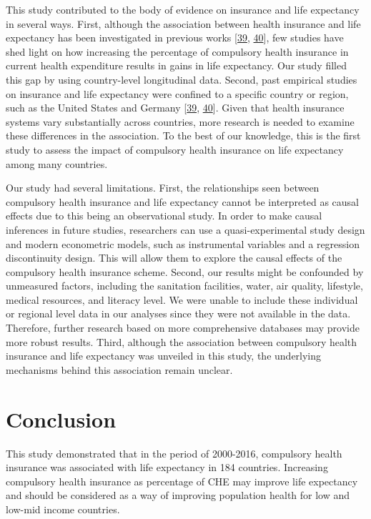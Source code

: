 \documentclass[]{elsarticle} %
\begin{document}
This study contributed to the body of evidence on insurance and life expectancy in several ways.
First, although the association between health insurance and life expectancy has been investigated in previous works {[}\protect\hyperlink{ref-bauernschuster2017bismarck}{39}, \protect\hyperlink{ref-Curtis1997}{40}{]}, few studies have shed light on how increasing the percentage of compulsory health insurance in current health expenditure results in gains in life expectancy.
Our study filled this gap by using country-level longitudinal data. Second, past empirical studies on insurance and life expectancy were confined to a specific country or region, such as the United States and Germany {[}\protect\hyperlink{ref-bauernschuster2017bismarck}{39}, \protect\hyperlink{ref-Curtis1997}{40}{]}.
Given that health insurance systems vary substantially across countries, more research is needed to examine these differences in the association. To the best of our knowledge, this is the first study to assess the impact of compulsory health insurance on life expectancy among many countries.

Our study had several limitations.
First, the relationships seen between compulsory health insurance and life expectancy cannot be interpreted as causal effects due to this being an observational study.
In order to make causal inferences in future studies, researchers can use a quasi-experimental study design and modern econometric models, such as instrumental variables and a regression discontinuity design.
This will allow them to explore the causal effects of the compulsory health insurance scheme. Second, our results might be confounded by unmeasured factors, including the sanitation facilities, water, air quality, lifestyle, medical resources, and literacy level.
We were unable to include these individual or regional level data in our analyses since they were not available in the data.
Therefore, further research based on more comprehensive databases may provide more robust results.
Third, although the association between compulsory health insurance and life expectancy was unveiled in this study, the underlying mechanisms behind this association remain unclear.

\hypertarget{conclusion}{%
\section{Conclusion}\label{conclusion}}

This study demonstrated that in the period of 2000-2016, compulsory health insurance was associated with life expectancy in 184 countries. Increasing compulsory health insurance as percentage of CHE may improve life expectancy and should be considered as a way of improving population health for low and low-mid income countries.
\end{document}
